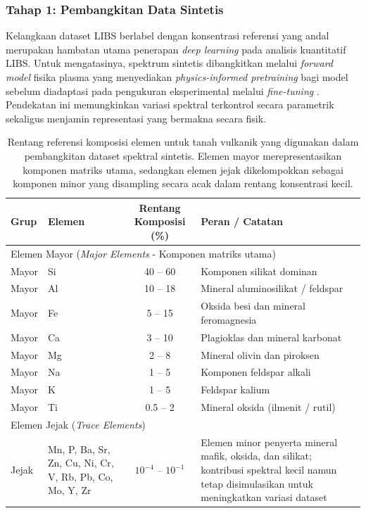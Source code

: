 \documentclass[12pt, a4paper]{article}
\begin{document}
\subsubsection{Tahap 1: Pembangkitan Data Sintetis}

Kelangkaan dataset LIBS berlabel dengan konsentrasi referensi yang andal merupakan hambatan utama penerapan \textit{deep learning} pada analisis kuantitatif LIBS. Untuk mengatasinya, spektrum sintetis dibangkitkan melalui \textit{forward model} fisika plasma yang menyediakan \textit{physics-informed pretraining} bagi model sebelum diadaptasi pada pengukuran eksperimental melalui \textit{fine-tuning} \citep{wang2024, favre2025b}. Pendekatan ini memungkinkan variasi spektral terkontrol secara parametrik sekaligus menjamin representasi yang bermakna secara fisik.

\begin{table}[H]
\centering
\caption{Rentang referensi komposisi elemen untuk tanah vulkanik yang digunakan dalam pembangkitan dataset spektral sintetis. Elemen mayor merepresentasikan komponen matriks utama, sedangkan elemen jejak dikelompokkan sebagai komponen minor yang disampling secara acak dalam rentang konsentrasi kecil.}
\label{tab:komposisi-tanah}
\small
\begin{tabular}{|l|p{4.5cm}|c|p{5cm}|}
\hline
Grup & Elemen & Rentang Komposisi (\%) & Peran / Catatan \\
\hline
\multicolumn{4}{|l|}{Elemen Mayor (\textit{Major Elements} - Komponen matriks utama)} \\
\hline
Mayor & Si & 40 -- 60 & Komponen silikat dominan \\
\hline
Mayor & Al & 10 -- 18 & Mineral aluminosilikat / feldspar \\
\hline
Mayor & Fe & 5 -- 15 & Oksida besi dan mineral feromagnesia \\
\hline
Mayor & Ca & 3 -- 10 & Plagioklas dan mineral karbonat \\
\hline
Mayor & Mg & 2 -- 8 & Mineral olivin dan piroksen \\
\hline
Mayor & Na & 1 -- 5 & Komponen feldspar alkali \\
\hline
Mayor & K & 1 -- 5 & Feldspar kalium \\
\hline
Mayor & Ti & 0.5 -- 2 & Mineral oksida (ilmenit / rutil) \\
\hline
\multicolumn{4}{|l|}{Elemen Jejak (\textit{Trace Elements})} \\
\hline
Jejak & Mn, P, Ba, Sr, Zn, Cu, Ni, Cr, V, Rb, Pb, Co, Mo, Y, Zr & $10^{-4}$ -- $10^{-1}$ & Elemen minor penyerta mineral mafik, oksida, dan silikat; kontribusi spektral kecil namun tetap disimulasikan untuk meningkatkan variasi dataset \\
\hline
\end{tabular}
\end{table}
\end{document}
